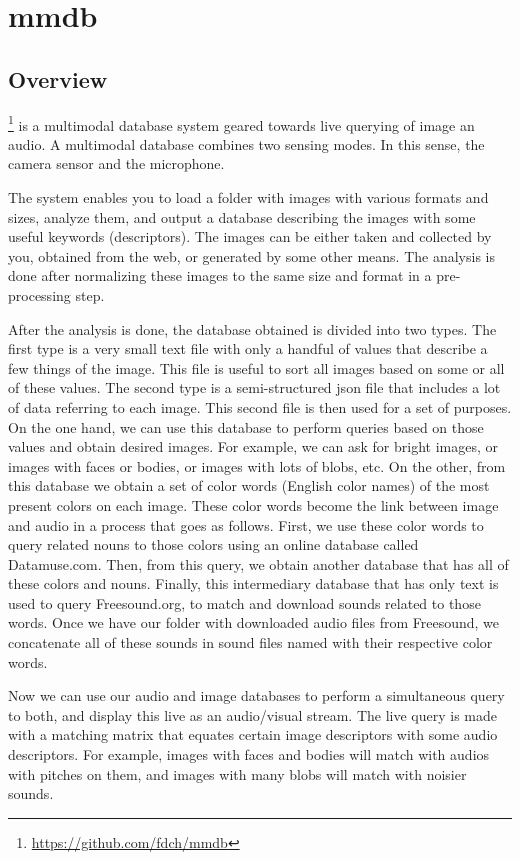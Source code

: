 \chapter{mmdb}

\section{Overview}

\footnote{\url{https://github.com/fdch/mmdb}} is a multimodal database system geared towards live querying of image an audio. A multimodal database combines two sensing modes. In this sense, the camera sensor and the microphone.

The system enables you to load a folder with images with various formats and sizes, analyze them, and output a database describing the images with some useful keywords (descriptors). The images can be either taken and collected by you, obtained from the web, or generated by some other means. The analysis is done after normalizing these images to the same size and format in a pre-processing step.

After the analysis is done, the database obtained is divided into two types. The first type is a very small text file with only a handful of values that describe a few things of the image. This file is useful to sort all images based on some or all of these values. The second type is a semi-structured \gls{json} file that includes a lot of data referring to each image. This second file is then used for a set of purposes. On the one hand, we can use this database to perform queries based on those values and obtain desired images. For example, we can ask for bright images, or images with faces or bodies, or images with lots of blobs, etc. On the other, from this database we obtain a set of color words (English color names) of the most present colors on each image. These color words become the link between image and audio in a process that goes as follows. First, we use these color words to query related nouns to those colors using an online database called Datamuse.com. Then, from this query, we obtain another database that has all of these colors and nouns. Finally, this intermediary database that has only text is used to query Freesound.org, to match and download sounds related to those words. Once we have our folder with downloaded audio files from Freesound, we concatenate all of these sounds in sound files named with their respective color words.

Now we can use our audio and image databases to perform a simultaneous query to both, and display this live as an audio/visual stream. The live query is made with a matching matrix that equates certain image descriptors with some audio descriptors. For example, images with faces and bodies will match with audios with pitches on them, and images with many blobs will match with noisier sounds.


